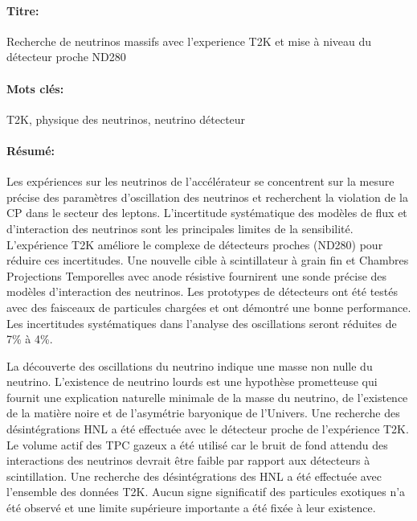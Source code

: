 \documentclass[../main.tex]{subfiles}
\begin{document}
\begin{mdframed}[linecolor=Prune,linewidth=1]
\vspace{-.25cm}
\paragraph*{Titre:} Recherche de neutrinos massifs avec l'experience T2K et mise à niveau du détecteur proche ND280

\begin{small}
\vspace{-.25cm}
\paragraph*{Mots clés:} T2K, physique des neutrinos, neutrino détecteur

\vspace{-.5cm}
\begin{multicols}{2}
\paragraph*{Résumé:} Les expériences sur les neutrinos de l'accélérateur se concentrent sur la mesure précise des paramètres d'oscillation des neutrinos et recherchent la violation de la CP dans le secteur des leptons. L'incertitude systématique des modèles de flux et d'interaction des neutrinos sont les principales limites de la sensibilité. L'expérience T2K améliore le complexe de détecteurs proches (ND280) pour réduire ces incertitudes. Une nouvelle cible à scintillateur à grain fin et Chambres Projections Temporelles avec anode résistive fournirent une sonde précise des modèles d'interaction des neutrinos. Les prototypes de détecteurs ont été testés avec des faisceaux de particules chargées et ont démontré une bonne performance. Les incertitudes systématiques dans l'analyse des oscillations seront réduites de 7\% à 4\%.

La découverte des oscillations du neutrino indique une masse non nulle du neutrino. L'existence de neutrino lourds est une hypothèse prometteuse qui fournit une explication naturelle minimale de la masse du neutrino, de l'existence de la matière noire et de l'asymétrie baryonique de l'Univers. Une recherche des désintégrations HNL a été effectuée avec le détecteur proche de l'expérience T2K. Le volume actif des TPC gazeux a été utilisé car le bruit de fond attendu des interactions des neutrinos devrait être faible par rapport aux détecteurs à scintillation. Une recherche des désintégrations des HNL a été effectuée avec l'ensemble des données T2K. Aucun signe significatif des particules exotiques n'a été observé et une limite supérieure importante a été fixée à leur existence.

\end{multicols}
\end{small}
\end{mdframed}
\end{document}
